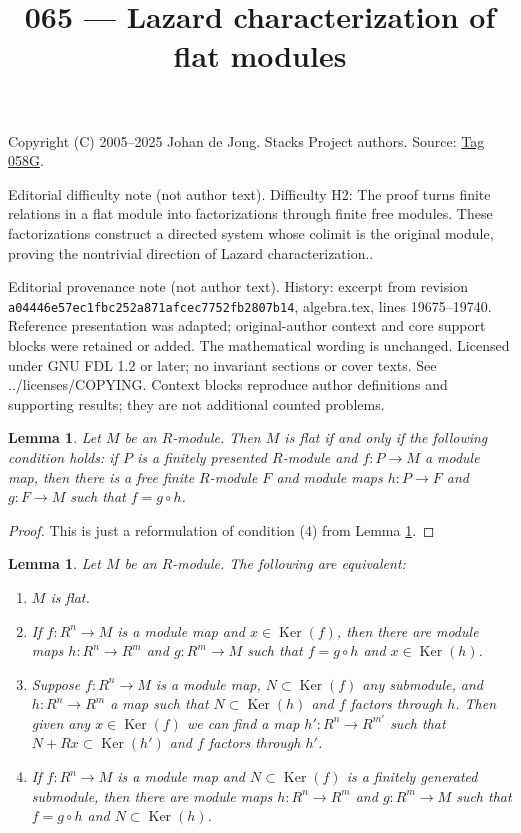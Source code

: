 \documentclass{amsart}
\theoremstyle{plain}
\newtheorem{lemma}[subsection]{Lemma}
\theoremstyle{definition}
\theoremstyle{remark}
\numberwithin{equation}{subsection}
\def\Ker{\mathop{\mathrm{Ker}}}
\begin{document}
\title[Stacks Project, Tag 058G]{065 --- Lazard characterization of flat modules}
\maketitle
\noindent Copyright (C) 2005--2025 Johan de Jong. Stacks Project authors. Source: \href{https://stacks.math.columbia.edu/tag/058G}{Tag 058G}.

\noindent Editorial difficulty note (not author text). Difficulty H2: The proof turns finite relations in a flat module into factorizations through finite free modules. These factorizations construct a directed system whose colimit is the original module, proving the nontrivial direction of Lazard characterization..

\noindent Editorial provenance note (not author text). History: excerpt from revision \texttt{a0444\allowbreak 6e57e\allowbreak c1fbc\allowbreak 252a8\allowbreak 71afc\allowbreak ec775\allowbreak 2fb28\allowbreak 07b14}, algebra.tex, lines 19675--19740. Reference presentation was adapted; original-author context and core support blocks were retained or added. The mathematical wording is unchanged. Licensed under GNU FDL 1.2 or later; no invariant sections or cover texts. See ../licenses/COPYING. Context blocks reproduce author definitions and supporting results; they are not additional counted problems.

\begin{lemma}
\label{lemma-flat-factors-fp}
Let $M$ be an $R$-module.  Then $M$ is flat if and only if the following
condition holds: if $P$ is a finitely presented $R$-module and $f: P
\to M$ a module map, then there is a free finite $R$-module $F$ and
module maps $h: P \to F$ and $g: F \to M$ such that $f = g
\circ h$.
\end{lemma}

\begin{proof}
This is just a reformulation of condition (4) from
Lemma \ref{lemma-flat-factors-free}.
\end{proof}


\begin{lemma}
\label{lemma-flat-factors-free}
Let $M$ be an $R$-module.  The following are equivalent:
\begin{enumerate}
\item $M$ is flat.
\item If $f: R^n \to M$ is a module map and $x \in \Ker(f)$, then there
are module maps $h: R^n \to R^m$ and $g: R^m \to M$ such that
$f = g \circ h$ and $x \in \Ker(h)$.
\item Suppose $f: R^n \to M$ is a module map, $N \subset \Ker(f)$ any
submodule, and $h: R^n \to R^{m}$ a map such that $N \subset \Ker(h)$
and $f$ factors through $h$.  Then given any $x \in \Ker(f)$ we can find a map
$h': R^n \to R^{m'}$ such that $N + Rx \subset \Ker(h')$ and $f$
factors through $h'$.
\item If $f: R^n \to M$ is a module map and $N \subset \Ker(f)$ is a
finitely generated submodule, then there are module maps $h: R^n \to
R^m$ and $g: R^m \to M$ such that $f = g \circ h$ and $N \subset
\Ker(h)$.
\end{enumerate}
\end{lemma}
\end{document}
